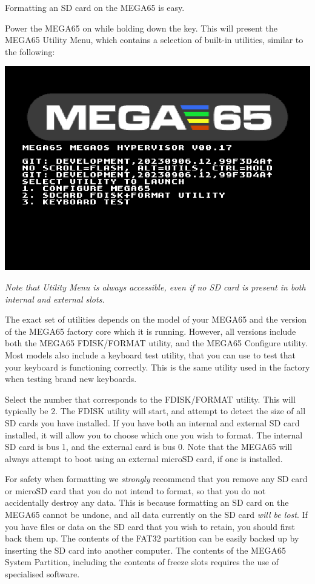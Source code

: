 Formatting an SD card on the MEGA65 is easy.

Power the MEGA65 on while holding down the  key.
This will present the MEGA65 Utility Menu, which contains a
selection of built-in utilities, similar to the following:

\includegraphics[width=\linewidth]{images/ss-utilmenu.png}

{\em Note that Utility Menu is always accessible, even if no SD card is present in both internal and external slots.}

The exact set of utilities
depends on the model of your MEGA65 and the version of the MEGA65
factory core which it is running. However, all versions include both
the MEGA65 FDISK/FORMAT utility, and the MEGA65 Configure utility.
Most models also include a keyboard test utility, that you can use
to test that your keyboard is functioning correctly.  This is
the same utility used in the factory when testing brand
new keyboards.

Select the number that corresponds to the FDISK/FORMAT utility.  This
will typically be 2.  The FDISK utility will start, and attempt to
detect the size of all SD cards you have installed.  If you have both
an internal and external SD card installed, it will allow you to
choose which one you wish to format. The internal SD card is bus 1,
and the external card is bus 0.  Note that the MEGA65 will
always attempt to boot using an external microSD card, if one is
installed.

For safety when formatting we {\em strongly} recommend
that you remove any SD card or microSD card that you do not intend to
format, so that you do not accidentally destroy any data.  This is
because formatting an SD card on the MEGA65 cannot be undone, and
all data currently on the SD card {\em will be lost}.  If you
have files or data on the SD card that you wish to retain, you
should first back them up.  The contents of the FAT32
partition can be easily backed up by inserting the SD card into
another computer.  The contents of the MEGA65 System Partition,
including the contents of freeze slots requires the use of specialised
software.

